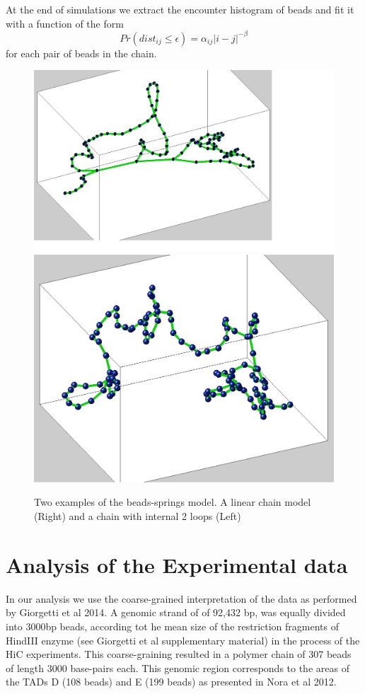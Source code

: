 \documentclass[12pt]{paper}
\begin{document}
At the end of simulations we extract the encounter histogram of beads and fit it with a function of the form 
\begin{equation*}
Pr(dist_{ij}\leq \epsilon)=\alpha_{ij}|i-j|^{-\beta}
\end{equation*}
for each pair of beads in the chain. 
\begin{figure}[H]
\includegraphics[scale=0.2]{chainExample108BeadsWith2Loops}
\includegraphics[scale=0.2]{chainExample108Beads}
\caption{\scriptsize{Two examples of the beads-springs model. A linear chain model (Right) and a chain with internal 2 loops (Left)}}\label{exampleOfChains}
\end{figure}


\section{Analysis of the Experimental data}
In our analysis we use the coarse-grained interpretation of the data as performed by Giorgetti et al 2014.  A genomic strand of of 92,432 bp, was equally divided into 3000bp beads, according tot he mean size of the restriction fragments of HindIII enzyme (see Giorgetti et al supplementary material) in the process of the HiC experiments. This coarse-graining resulted in a polymer chain of 307 beads of length 3000 base-pairs each. This genomic region corresponds to the areas of the TADs D (108 beads) and E (199 beads) as presented in Nora et al 2012. 
\end{document}
